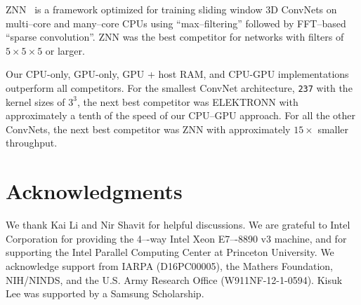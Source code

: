 \documentclass[conference]{./IEEEtran}
\begin{document}
  ZNN~\cite{zlateski2015znn} is a framework optimized for training
  sliding window 3D ConvNets on multi--core and many--core CPUs using
  ``max--filtering'' followed by FFT--based ``sparse convolution''.
  ZNN was the best competitor for networks with filters of $5 \times 5
  \times 5$ or larger.

  Our CPU-only, GPU-only, GPU + host RAM, and CPU-GPU implementations
  outperform all competitors.  For the smallest ConvNet architecture,
  {\tt 237} with the kernel sizes of $3^3$, the next best competitor
  was ELEKTRONN with approximately a tenth of the speed of our
  CPU--GPU approach. For all the other ConvNets, the next best
  competitor was ZNN with approximately $15 \times$ smaller
  throughput.



\section*{Acknowledgments}
We thank Kai Li and Nir Shavit for helpful discussions.  We are
grateful to Intel Corporation for providing the 4–-way Intel Xeon
E7–-8890 v3 machine, and for supporting the Intel Parallel Computing
Center at Princeton University.  We acknowledge support from IARPA
(D16PC00005), the Mathers Foundation, NIH/NINDS, and the U.S. Army
Research Office (W911NF-12-1-0594). Kisuk Lee was supported by a
Samsung Scholarship.

\end{document}
